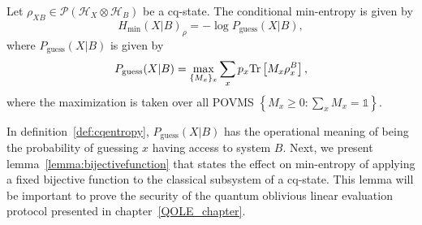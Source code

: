 \begin{definition}
\label{def:cqentropy}
Let $\rho_{X B}\in\mathcal{P}(\mathcal{H}_X \otimes \mathcal{H}_{B})$ be a cq-state. The conditional min-entropy is given by
$$H_{\min}(X|B)_{\rho} = -\log P_{\text{guess}}(X|B),$$
where $P_{\text{guess}}(X|B)$ is given by
$$P_{\text{guess}}(X|B) = \max_{\{M_x\}_x} \sum_x p_x \text{Tr}\left[M_x \rho_{x}^B\right],$$
where the maximization is taken over all POVMS $\left\{ M_x \geq 0 : \sum_x M_x = \mathds{1} \right\}$.
\end{definition}

In definition~\ref{def:cqentropy}, $P_{\text{guess}}(X|B)$ has the operational meaning of being the probability of guessing $x$ having access to system $B$. Next, we present lemma~\ref{lemma:bijectivefunction} that states the effect on min-entropy of applying a fixed bijective function to the classical subsystem of a cq-state. This lemma will be important to prove the security of the quantum oblivious linear evaluation protocol presented in chapter~\ref{QOLE_chapter}.

